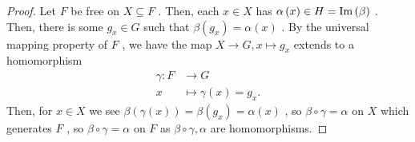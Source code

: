 \begin{proof}
	Let \(F\)  be free on \( X \subseteq F\) . Then, each \(x \in X\)  has \(\alpha\left( x \right) \in H = \operatorname{Im}\left( \beta \right) \) . Then, there is some \(g_{x} \in G\)  such that \(\beta\left( g_{x} \right) = \alpha\left( x \right)  \) . By the universal mapping property of \(F\) , we have the map \(X \to G, x \mapsto g_{x}\) extends to a homomorphism \begin{align*}
		\gamma: F &\longrightarrow G \\
		x &\longmapsto \gamma(x) = g_{x}
	.\end{align*}
	Then, for \(x \in X\) we see \(\beta\left( \gamma\left( x \right)  \right)  = \beta\left( g_{x} \right) = \alpha\left( x \right)  \)  , so \(\beta \circ \gamma = \alpha\)  on \(X\)  which generates \(F\) , so \(\beta \circ \gamma = \alpha\)  on \(F\)  as \(\beta \circ \gamma, \alpha\)  are homomorphisms.
\end{proof}
